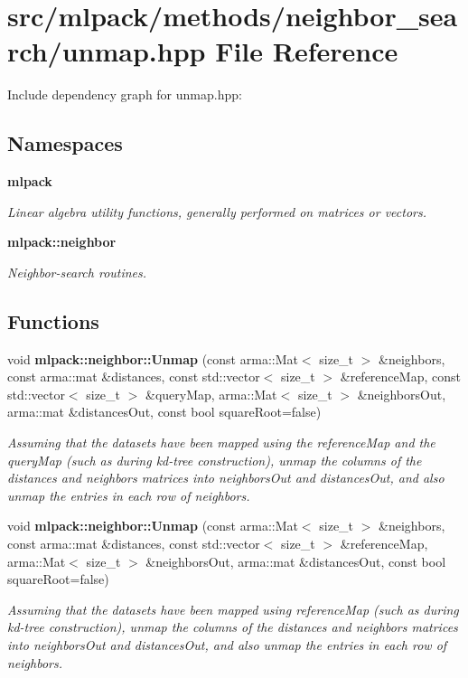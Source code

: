 \section{src/mlpack/methods/neighbor\-\_\-search/unmap.hpp File Reference}
\label{unmap_8hpp}
Include dependency graph for unmap.\-hpp\-:
\subsection*{Namespaces}
\begin{DoxyCompactItemize}
\item 
{\bf mlpack}
\begin{DoxyCompactList}\small\item\em Linear algebra utility functions, generally performed on matrices or vectors. \end{DoxyCompactList}\item 
{\bf mlpack\-::neighbor}
\begin{DoxyCompactList}\small\item\em Neighbor-\/search routines. \end{DoxyCompactList}\end{DoxyCompactItemize}
\subsection*{Functions}
\begin{DoxyCompactItemize}
\item 
void {\bf mlpack\-::neighbor\-::\-Unmap} (const arma\-::\-Mat$<$ size\-\_\-t $>$ \&neighbors, const arma\-::mat \&distances, const std\-::vector$<$ size\-\_\-t $>$ \&reference\-Map, const std\-::vector$<$ size\-\_\-t $>$ \&query\-Map, arma\-::\-Mat$<$ size\-\_\-t $>$ \&neighbors\-Out, arma\-::mat \&distances\-Out, const bool square\-Root=false)
\begin{DoxyCompactList}\small\item\em Assuming that the datasets have been mapped using the reference\-Map and the query\-Map (such as during kd-\/tree construction), unmap the columns of the distances and neighbors matrices into neighbors\-Out and distances\-Out, and also unmap the entries in each row of neighbors. \end{DoxyCompactList}\item 
void {\bf mlpack\-::neighbor\-::\-Unmap} (const arma\-::\-Mat$<$ size\-\_\-t $>$ \&neighbors, const arma\-::mat \&distances, const std\-::vector$<$ size\-\_\-t $>$ \&reference\-Map, arma\-::\-Mat$<$ size\-\_\-t $>$ \&neighbors\-Out, arma\-::mat \&distances\-Out, const bool square\-Root=false)
\begin{DoxyCompactList}\small\item\em Assuming that the datasets have been mapped using reference\-Map (such as during kd-\/tree construction), unmap the columns of the distances and neighbors matrices into neighbors\-Out and distances\-Out, and also unmap the entries in each row of neighbors. \end{DoxyCompactList}\end{DoxyCompactItemize}


